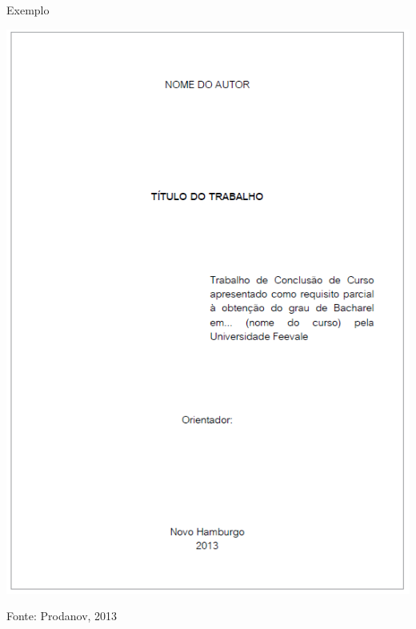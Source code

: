 \documentclass{beamer}
\begin{document}
\begin{frame}{Exemplo}
  \begin{center}
    \includegraphics[height=0.8\textheight]{ProjetoII/rosto}
  \end{center}

  \vfill
  Fonte: Prodanov, 2013
\end{frame}

\end{document}
